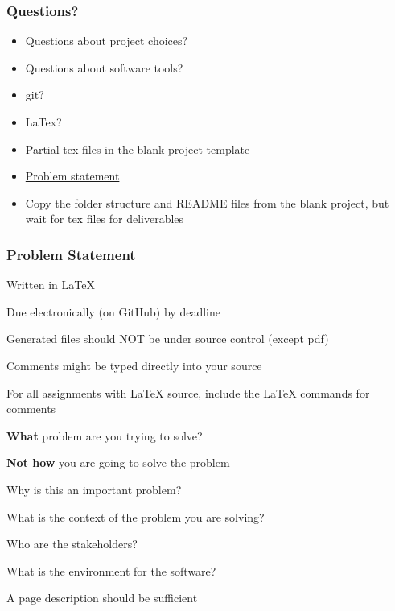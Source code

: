 \documentclass[t,12pt,numbers,fleqn]{beamer}
\begin{document}


\begin{frame}
\frametitle{Questions?}
\begin{itemize}
\item Questions about project choices?
\item Questions about software tools?
\bi
\item git?
\item LaTex?
\ei
\item Partial tex files in the blank project template
\item
  \href{https://gitlab.cas.mcmaster.ca/smiths/cas741/tree/master/BlankProjectTemplate/docs/ProblemStatement}{Problem
    statement}
\item Copy the folder structure and README files from the blank project, but
  wait for tex files for deliverables
\end{itemize}
\end{frame}


\begin{frame}
\frametitle{Problem Statement}
\bi
\item Written in LaTeX
\item Due electronically (on GitHub) by deadline
\item Generated files should NOT be under source control (except pdf)
\item Comments might be typed directly into your source
\item For all assignments with LaTeX source, include the LaTeX
  commands for comments
\item \textbf{What} problem are you trying to solve?
\item \textbf{Not how} you are going to solve the problem
\item Why is this an important problem?
\item What is the context of the problem you are solving? 
\bi
\item Who are the stakeholders?
\item What is the environment for the software?
\ei
\item A page description should be sufficient
\ei
\end{frame}

\end{document}

